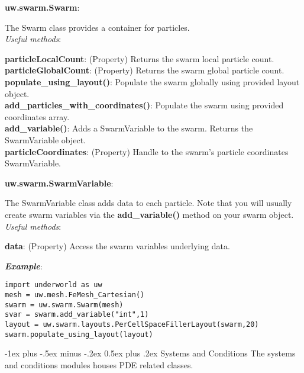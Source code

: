 \documentclass[10pt,landscape]{article}
\makeatletter
\renewcommand{\section}{\@startsection{section}{1}{0mm}%
                                {-1ex plus -.5ex minus -.2ex}%
                                {0.5ex plus .2ex}%
                                {\normalfont\large\bfseries}}
\makeatother
\begin{document}
\begin{multicols}{2}
\noindent\textbf{uw.swarm.Swarm}:
\begin{addmargin}[1em]{2em}
The Swarm class provides a container for particles.\\
\vspace{1mm}
\textit{Useful methods}:\\
\begin{addmargin}[1em]{2em}
\textbf{particleLocalCount}: (Property) Returns the swarm local particle count.\\
\textbf{particleGlobalCount}: (Property) Returns the swarm global particle count.\\
\textbf{populate\_using\_layout()}: Populate the swarm globally using provided layout object.\\
\textbf{add\_particles\_with\_coordinates()}: Populate the swarm using provided coordinates array.\\
\textbf{add\_variable()}: Adds a SwarmVariable to the swarm. Returns the SwarmVariable object.\\
\textbf{particleCoordinates}: (Property) Handle to the swarm's particle coordinates SwarmVariable.\\
\end{addmargin}
\end{addmargin}
\vspace{2mm}
\noindent\textbf{uw.swarm.SwarmVariable}:
\begin{addmargin}[1em]{2em}
The SwarmVariable class adds data to each particle. Note that you will usually create swarm
variables via the \textbf{add\_variable()} method on your swarm object.\\
\vspace{1mm}
\textit{Useful methods}:\\
\begin{addmargin}[1em]{2em}
\textbf{data}: (Property) Access the swarm variables underlying data.\\
\end{addmargin}
\end{addmargin}

\vspace{2mm}
\noindent\textbf{\textit{Example}}:
\begin{lstlisting}
import underworld as uw
mesh = uw.mesh.FeMesh_Cartesian()
swarm = uw.swarm.Swarm(mesh)
svar = swarm.add_variable("int",1)
layout = uw.swarm.layouts.PerCellSpaceFillerLayout(swarm,20)
swarm.populate_using_layout(layout)
\end{lstlisting}


\section{Systems and Conditions}
The systems and conditions modules houses PDE related classes.\\
\vspace{1mm}


\end{multicols}
\end{document}
